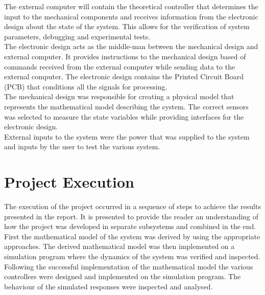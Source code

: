 The external computer will contain the theoretical controller that determines the input to the mechanical components and receives information from the electronic design about the state of the system. This allows for the verification of system parameters, debugging and experimental tests.\\

The electronic design acts as the middle-man between the mechanical design and external computer. It provides instructions to the mechanical design based of commands received from the external computer while sending data to the external computer. The electronic design contains the Printed Circuit Board (PCB) that conditions all the signals for processing.\\

The mechanical design was responsible for creating a physical model that represents the mathematical model describing the system. The correct sensors was selected to measure the state variables while providing interfaces for the electronic design.\\

External inputs to the system were the power that was supplied to the system and inputs by the user to test the various system.

\section{Project Execution}

The execution of the project occurred in a sequence of steps to achieve the results presented in the report. It is presented to provide the reader an understanding of how the project was developed in separate subsystems and combined in the end.\\
 
First the mathematical model of the system was derived by using the appropriate approaches. The derived mathematical model was then implemented on a simulation program where the dynamics of the system was verified and inspected.\\

Following the successful implementation of the mathematical model the various controllers were designed and implemented on the simulation program. The behaviour of the simulated responses were inspected and analysed.\\

